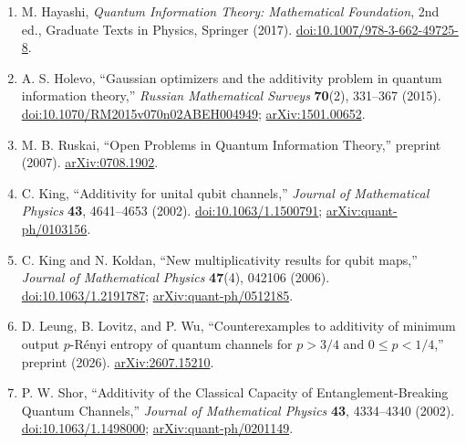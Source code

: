 \begin{enumerate}[label={},leftmargin=4.8em,labelsep=0.5em]
  \footnotesize
  \item[\textup{[Hay17]}]\label{ref:h11-book}
  M. Hayashi, \emph{Quantum Information Theory: Mathematical Foundation}, 2nd ed., Graduate Texts in Physics, Springer (2017). \href{https://doi.org/10.1007/978-3-662-49725-8}{doi:10.1007/978-3-662-49725-8}.

  \item[\textup{[Hol15]}]\label{ref:h11-holevo}
  A. S. Holevo, ``Gaussian optimizers and the additivity problem in quantum information theory,'' \emph{Russian Mathematical Surveys} \textbf{70}(2), 331--367 (2015). \href{https://doi.org/10.1070/RM2015v070n02ABEH004949}{doi:10.1070/RM2015v070n02ABEH004949}; \href{https://arxiv.org/abs/1501.00652}{arXiv:1501.00652}.

  \item[\textup{[Rus07]}]\label{ref:h11-ruskai}
  M. B. Ruskai, ``Open Problems in Quantum Information Theory,'' preprint (2007). \href{https://arxiv.org/abs/0708.1902}{arXiv:0708.1902}.

  \item[\textup{[Kin02]}]\label{ref:h11-king}
  C. King, ``Additivity for unital qubit channels,'' \emph{Journal of Mathematical Physics} \textbf{43}, 4641--4653 (2002). \href{https://doi.org/10.1063/1.1500791}{doi:10.1063/1.1500791}; \href{https://arxiv.org/abs/quant-ph/0103156}{arXiv:quant-ph/0103156}.

  \item[\textup{[KK06]}]\label{ref:h11-kk}
  C. King and N. Koldan, ``New multiplicativity results for qubit maps,'' \emph{Journal of Mathematical Physics} \textbf{47}(4), 042106 (2006). \href{https://doi.org/10.1063/1.2191787}{doi:10.1063/1.2191787}; \href{https://arxiv.org/abs/quant-ph/0512185}{arXiv:quant-ph/0512185}.

  \item[\textup{[LLW26]}]\label{ref:h11-llw}
  D. Leung, B. Lovitz, and P. Wu, ``Counterexamples to additivity of minimum output $p$-R\'enyi entropy of quantum channels for $p>3/4$ and $0\leq p<1/4$,'' preprint (2026). \href{https://arxiv.org/abs/2607.15210}{arXiv:2607.15210}.

  \item[\textup{[Sho02]}]\label{ref:h11-shor}
  P. W. Shor, ``Additivity of the Classical Capacity of Entanglement-Breaking Quantum Channels,'' \emph{Journal of Mathematical Physics} \textbf{43}, 4334--4340 (2002). \href{https://doi.org/10.1063/1.1498000}{doi:10.1063/1.1498000}; \href{https://arxiv.org/abs/quant-ph/0201149}{arXiv:quant-ph/0201149}.
\end{enumerate}

